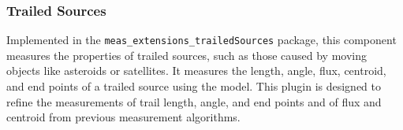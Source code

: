 \subsubsection{Trailed Sources}
\label{sec:trailed-sources}

Implemented in the \texttt{meas\_extensions\_trailed\-Sources} package, this component measures the properties of trailed sources, such as those caused by moving objects like asteroids or satellites.
It measures the length, angle, flux, centroid, and end points of a trailed source using the \citet{2012PASP..124.1197V} model.
This plugin is designed to refine the measurements of trail length, angle, and end points and of flux and centroid from previous measurement algorithms.
